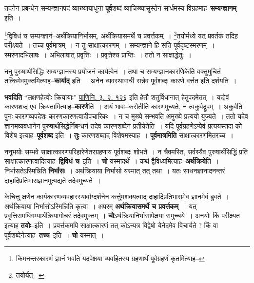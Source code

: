 \documentclass[article,12pt,a4paper]{memoir}
\begin{document}
	  \pstart तदनेन प्रबन्धेन सम्यग्ज्ञानपदं व्याख्यायाधुना \textbf{पूर्व}शब्दं व्याचिख्यासुस्तेन सार्धमस्य विग्रहमाह--\textbf{सम्यग्ज्ञानम्} इति ।
	\pend
      \leavevmode{}
	  \bigskip
	  \begingroup
	

	  \pstart \footnote{किमनन्तरकारणं ज्ञानं भवति यदपेक्षया व्यवहितस्य ग्रहणार्थं पूर्वग्रहणं कृतमित्याह--\cite{dp-msD-n}}द्विविधं च सम्यग्ज्ञानं--अर्थक्रियानिर्भासम्, अर्थक्रियासमर्थे च प्रवर्त्तकम् । \footnote{तयोर्यत्--\cite{dp-msA} \cite{dp-edP} \cite{dp-edH} \cite{dp-edE} \cite{dp-edN}}तयोर्मध्ये यत् प्रवर्तकं तदिह परीक्ष्यते । तच्च पूर्वमात्रम् । न तु साक्षात्कारणम् । सम्यग्ज्ञाने हि सति पूर्वदृष्टस्मरणम् । स्मरणादभिलाषः । अभिलाषात् प्रवृत्तिः । प्रवृत्तेश्च प्राप्तिः । ततो न साक्षाद्धेतुः ।
	\pend
      
	  \endgroup
	

	  \pstart ननु पुरुषार्थसिद्धिः सम्यग्ज्ञानस्य प्रयोजनं कार्यत्वेन । तथा च सम्यग्ज्ञानकारणिकेति वक्तुमुचितं तत्किमेवमुक्तमित्याह--\textbf{कार्याद्} इति । अनेन व्यवस्थावाची सन्नेव पूर्वशब्दः कारणे वर्त्तत इति दर्शयति ।
	\pend
      

	  \pstart \textbf{भवदिति} “लक्षणहेत्वोः क्रियायाः” \href{http://http://sarit.indology.info/?cref=Pā.3.2.126}{पाणिनि. ३. २. १२६} इति हेतौ शतुर्विधानात् हेतुपदमेतत् । यद्येवं कारणशब्द एव क्रियतामित्याह--\textbf{कारणे}ति । अयं भावः--करोतीति कारणमुच्यते, न त्वकुर्वद्रूपम् । अकुर्वति पुनः कारणव्यपदेशः कारणकारणत्वादीपचारिकः । न च मुख्ये सम्भवति अमुख्ये प्रत्ययो युज्यते । ततो यदेव ज्ञानमव्यवधानेन पुरुषार्थसिद्धेर्निबन्धनं तदेव कारणशब्देन प्रतीयेतेति । यदि पूर्वग्रहणेऽप्येवं प्रत्ययस्तदा को विशेष इत्याह--\textbf{पूर्वशब्द} इति । \textbf{तुः} कारणशब्दाद् विशेषमस्याह । \textbf{पूर्वमात्रमिति} साक्षात्कारणमितरच्च ।
	\pend
      

	  \pstart ननूभयोः सम्भवे साक्षात्कारणपरिहारेणेतरग्रहणाय पूर्वशब्दः शोभते । न चैवमस्ति, सर्वस्यैव पुरुषार्थसिद्धिं प्रति साक्षात्कारणत्वादित्याह--\textbf{द्विविधं च}--इति । \textbf{चो} यस्मादर्थे । कथं द्वैविध्यमित्याह--\textbf{अर्थक्रिये}ति । निर्भासतेऽस्मिन्निति \textbf{निर्भासः} । अर्थक्रियाया निर्भासो यस्मात् तत् तथा । यतः साधनज्ञानादनन्तरं दाहादिप्रतिभासज्ञानमुत्पद्यते तदेवमुच्यते ।
	\pend
      

	  \pstart केचित्तु क्षणेन कार्यकारणव्यवहारस्यार्वाग्दर्शनेन कर्त्तुमशक्यत्वाद् दाहादिप्रतिभासमेव ज्ञानमेवं ब्रुवते । अर्थक्रियाया \leavevmode{} निर्भासोऽस्मिन्निति कृत्वा । अपरम् \textbf{अर्थक्रियासमर्थे च प्रवर्त्तकम्} । यत् प्रवृत्तिसमधिगम्यार्थक्रियागोचरं तदेवमुक्तम् । \textbf{चो}ऽर्थक्रियानिर्भासापेक्षया समुच्चये । अनयोः किं परीक्ष्यत इत्याह \textbf{तयोः}--इति । प्रवर्त्तकमपि साक्षात्कारणं तत् कोऽन्यत्र विद्वेषो येनेदमेव विचार्यते ? किं वा पूर्वशब्देनेत्याह--\textbf{तच्च}--इति । \textbf{चो} यस्मात् ।
	\pend
      
\end{document}

